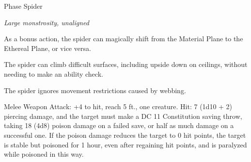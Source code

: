 \begin{monsterbox}{Phase Spider}
\begin{hangingpar}
\textit{Large monstrosity, unaligned}
\end{hangingpar}
\dndline%
\basics[%
armorclass = 13,
hitpoints = 5d10 + 5,
speed = {30 ft., climb 30 ft.}
]
\dndline%
\stats[%
STR = \stat{15},
DEX = \stat{15},
CON = \stat{12},
INT = \stat{6},
WIS = \stat{10},
CHA = \stat{6}
]
\dndline%
\details[%
skills={Stealth +6, },
damageimmunities={},
savingthrows={},
conditionimmunities={},
damageresistances={},
damagevulnerabilities={},
senses={darkvision 60 ft., passive Perception 10},
challenge=3
]
\dndline%
\begin{monsteraction}
As a bonus action, the spider can magically shift from the Material Plane to the Ethereal Plane, or vice versa.
\end{monsteraction}
\begin{monsteraction}
The spider can climb difficult surfaces, including upside down on ceilings, without needing to make an ability check.
\end{monsteraction}
\begin{monsteraction}
The spider ignores movement restrictions caused by webbing.
\end{monsteraction}
\begin{monsteraction}[Bite]
Melee Weapon Attack: +4 to hit, reach 5 ft., one creature. Hit: 7 (1d10 + 2) piercing damage, and the target must make a DC 11 Constitution saving throw, taking 18 (4d8) poison damage on a failed save, or half as much damage on a successful one. If the poison damage reduces the target to 0 hit points, the target is stable but poisoned for 1 hour, even after regaining hit points, and is paralyzed while poisoned in this way.
\end{monsteraction}
\end{monsterbox}